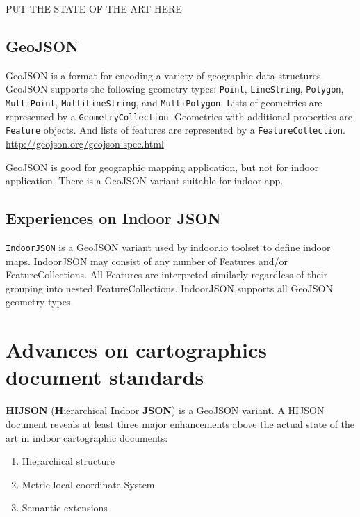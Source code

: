\documentclass{sig-alternate}
\begin{document}
PUT THE STATE OF THE ART HERE

\subsection{GeoJSON}\label{geojson}

GeoJSON is a format for encoding a variety of geographic data
structures. GeoJSON supports the following geometry types:
\texttt{Point}, \texttt{LineString}, \texttt{Polygon},
\texttt{MultiPoint}, \texttt{MultiLineString}, and
\texttt{MultiPolygon}. Lists of geometries are represented by a
\texttt{GeometryCollection}. Geometries with additional properties are
\texttt{Feature} objects. And lists of features are represented by a
\texttt{FeatureCollection}.
\href{GeoJSON\%20spec}{http://geojson.org/geojson-spec.html}

GeoJSON is good for geographic mapping application, but not for indoor
application. There is a GeoJSON variant suitable for indoor app.

\subsection{Experiences on Indoor
JSON}\label{experiences-on-indoor-json}

\texttt{IndoorJSON} is a GeoJSON variant used by indoor.io toolset to
define indoor maps. IndoorJSON may consist of any number of Features
and/or FeatureCollections. All Features are interpreted similarly
regardless of their grouping into nested FeatureCollections. IndoorJSON
supports all GeoJSON geometry types.

\section{Advances on cartographics document
standards}\label{advances-on-cartographics-document-standards}

\textbf{HIJSON} (\textbf{H}ierarchical \textbf{I}ndoor \textbf{JSON}) is
a GeoJSON variant. A HIJSON document reveals at least three major
enhancements above the actual state of the art in indoor cartographic
documents:

\begin{enumerate}
\def\labelenumi{\arabic{enumi}.}
\itemsep1pt\parskip0pt
\item
  Hierarchical structure
\item
  Metric local coordinate System
\item
  Semantic extensions
\end{enumerate}
\end{document}
